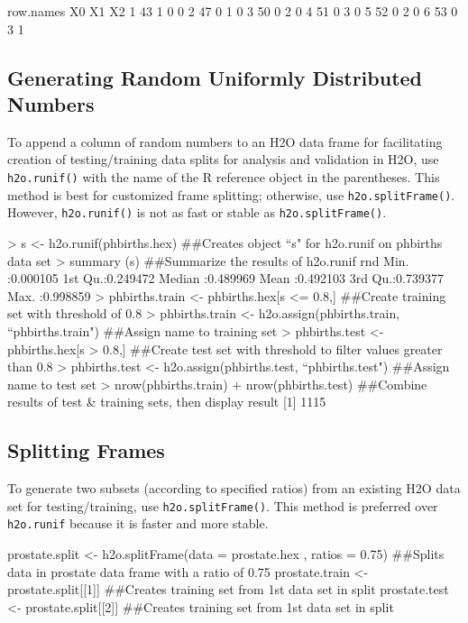 \documentclass[11pt]{article}
\begin{document}
{\begin{spverbatim}
  row.names X0 X1 X2
1        43  1  0  0
2        47  0  1  0
3        50  0  2  0
4        51  0  3  0
5        52  0  2  0
6        53  0  3  1
\end{spverbatim}


\subsection{Generating Random Uniformly Distributed Numbers}

To append a column of random numbers to an H2O data frame for facilitating creation of testing/training data splits for analysis and validation in H2O, use {\texttt{h2o.runif()}} with the name of the R reference object in the parentheses. This method is best for customized frame splitting; otherwise, use {\texttt{h2o.splitFrame()}}. However, {\texttt{h2o.runif()}} is not as fast or stable as {\texttt{h2o.splitFrame()}}. 

\begin{spverbatim}
> s <- h2o.runif(phbirths.hex) ##Creates object “s" for h2o.runif on phbirths data set
> summary (s)  ##Summarize the results of h2o.runif
 rnd               
 Min.   :0.000105  
 1st Qu.:0.249472  
 Median :0.489969  
 Mean   :0.492103  
 3rd Qu.:0.739377  
 Max.   :0.998859  
> phbirths.train <- phbirths.hex[s <= 0.8,] ##Create training set with threshold of 0.8
> phbirths.train <- h2o.assign(phbirths.train, “phbirths.train") ##Assign name to training set
> phbirths.test <- phbirths.hex[s > 0.8,] ##Create test set with threshold to filter values greater than 0.8
> phbirths.test <- h2o.assign(phbirths.test, “phbirths.test") ##Assign name to test set
> nrow(phbirths.train) + nrow(phbirths.test) ##Combine results of test & training sets, then display result
[1] 1115
\end{spverbatim}
 

\subsection{Splitting Frames}

To generate two subsets (according to specified ratios) from an existing H2O data set for testing/training, use {\texttt{h2o.splitFrame()}}.  This method is preferred over {\texttt{h2o.runif}} because it is faster and more stable. 

\begin{spverbatim}
prostate.split <- h2o.splitFrame(data = prostate.hex , ratios = 0.75)
##Splits data in prostate data frame with a ratio of 0.75
prostate.train <- prostate.split[[1]] 
##Creates training set from 1st data set in split
prostate.test <- prostate.split[[2]]
##Creates training set from 1st data set in split
\end{spverbatim}


}
\end{document}
